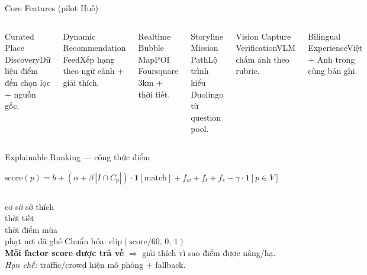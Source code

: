 \documentclass[aspectratio=169, 10pt]{beamer}
\begin{document}
\begin{frame}{Core Features (pilot Huế)}
  \begin{columns}[T]
    \begin{card}{Curated Place Discovery}\scriptsize Dữ liệu điểm đến chọn lọc + nguồn gốc.\end{card}\vspace{2pt}
    \begin{card}{Dynamic Recommendation Feed}\scriptsize Xếp hạng theo ngữ cảnh + giải thích.\end{card}\vspace{2pt}
    \begin{card}{Realtime Bubble Map}\scriptsize POI Foursquare 3km + thời tiết.\end{card}
    \begin{card}{Storyline Mission Path}\scriptsize Lộ trình kiểu Duolingo từ question pool.\end{card}\vspace{2pt}
    \begin{card}{Vision Capture Verification}\scriptsize VLM chấm ảnh theo rubric.\end{card}\vspace{2pt}
    \begin{card}{Bilingual Experience}\scriptsize Việt + Anh trong cùng bản ghi.\end{card}
  \end{columns}
\end{frame}

\begin{frame}{Explainable Ranking --- công thức điểm}
  \begin{center}
  \small
  $\text{score}(p) = b + (\alpha+\beta\,|I\cap C_p|)\cdot\mathbf{1}[\text{match}] + f_w + f_t + f_s - \gamma\cdot\mathbf{1}[p\in V]$
  \end{center}
  \vspace{1mm}
  \begin{columns}[T]
  \scriptsize
   cơ sở \quad {} sở thích\\[3pt]
   thời tiết\\[3pt]
   thời điểm \quad {} mùa\\[3pt]
   phạt nơi đã ghé
  \scriptsize
  Chuẩn hóa: $\text{clip}(\text{score}/60,\,0,\,1)$\\[4pt]
  \textbf{Mỗi factor score được trả về} $\Rightarrow$ giải thích vì sao điểm được nâng/hạ.\\[4pt]
  \textit{Hạn chế:} traffic/crowd hiện mô phỏng + fallback.
  \end{columns}
\end{frame}
\end{document}
